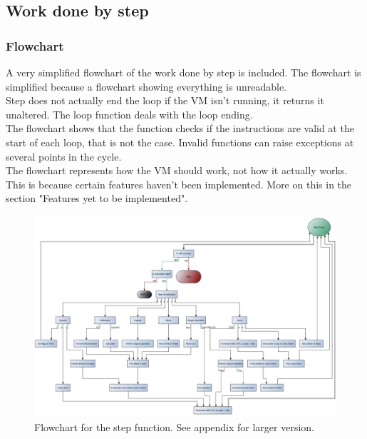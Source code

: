 \documentclass{article}
\begin{document}
\subsection{Work done by step}

\subsubsection{Flowchart}
A very simplified flowchart of the work done by step is included. The flowchart is simplified because a flowchart showing everything is unreadable.
\\
Step does not actually end the loop if the VM isn't running, it returns it unaltered. The loop function deals with the loop ending.
\\
The flowchart shows that the function checks if the instructions are valid at the start of each loop, that is not the case. Invalid functions can raise exceptions at several points in the cycle.
\\
The flowchart represents how the VM should work, not how it actually works. This is because certain features haven't been implemented. More on this in the section "Features yet to be implemented".
\begin{figure}[H]
\begin{centering}
\includegraphics[width=\textwidth,height=\textheight,keepaspectratio]{Flowchart_VM.png}
\caption{Flowchart for the step function. See appendix for larger version.}
\end{centering}
\end{figure}
\end{document}
